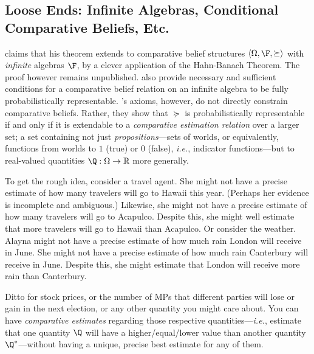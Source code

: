 \subsection{Loose Ends: Infinite Algebras, Conditional Comparative Beliefs, Etc.}

\citet[p. 247]{Scott1964} claims that his theorem extends to comparative belief structures $\left<\Omega,\F,\succeq\right>$ with \textit{infinite} algebras $\F$, by a clever application of the Hahn-Banach Theorem. The proof however remains unpublished. \citet{Suppes1976} also provide necessary and sufficient conditions for a comparative belief relation on an infinite algebra to be fully probabilistically representable. \citeauthor{Suppes1976}'s axioms, however, do not directly constrain comparative beliefs. Rather, they show that $\succeq$ is probabilistically representable if and only if it is extendable to a \textit{comparative estimation relation} over a larger set; a set containing not just \textit{propositions}---sets of worlds, or equivalently, functions from worlds to $1$ (true) or $0$ (false), \textit{i.e.}, indicator functions---but to real-valued quantities $\Q:\Omega\rightarrow\mathbb{R}$ more generally.

To get the rough idea, consider a travel agent. She might not have a precise estimate of how many travelers will go to Hawaii this year. (Perhaps her evidence is incomplete and ambiguous.) Likewise, she might not have a precise estimate of how many travelers will go to Acapulco. Despite this, she might well estimate that more travelers will go to Hawaii than Acapulco. Or consider the weather. Alayna might not have a precise estimate of how much rain London will receive in June. She might not have a precise estimate of how much rain Canterbury will receive in June. Despite this, she might estimate that London will receive more rain than Canterbury. 

Ditto for stock prices, or the number of MPs that different parties will lose or gain in the next election, or any other quantity you might care about. You can have \textit{comparative estimates} regarding those respective quantities---\textit{i.e.}, estimate that one quantity $\Q$ will have a higher/equal/lower value than another quantity $\Q^*$---without having a unique, precise best estimate for any of them.

